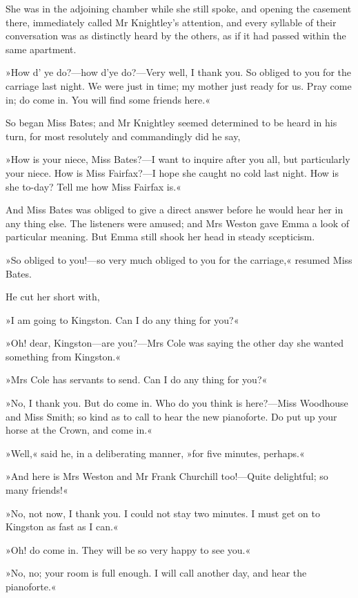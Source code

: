 She was in the adjoining chamber while she still spoke, and opening the casement there, immediately called Mr Knightley's attention, and every syllable of their conversation was as distinctly heard by the others, as if it had passed within the same apartment.

»How d' ye do?—how d'ye do?—Very well, I thank you. So obliged to you for the carriage last night. We were just in time; my mother just ready for us. Pray come in; do come in. You will find some friends here.«

So began Miss Bates; and Mr Knightley seemed determined to be heard in his turn, for most resolutely and commandingly did he say,

»How is your niece, Miss Bates?—I want to inquire after you all, but particularly your niece. How is Miss Fairfax?—I hope she caught no cold last night. How is she to-day? Tell me how Miss Fairfax is.«

And Miss Bates was obliged to give a direct answer before he would hear her in any thing else. The listeners were amused; and Mrs Weston gave Emma a look of particular meaning. But Emma still shook her head in steady scepticism.

»So obliged to you!—so very much obliged to you for the carriage,« resumed Miss Bates.

He cut her short with,

»I am going to Kingston. Can I do any thing for you?«

»Oh! dear, Kingston—are you?—Mrs Cole was saying the other day she wanted something from Kingston.«

»Mrs Cole has servants to send. Can I do any thing for you?«

»No, I thank you. But do come in. Who do you think is here?—Miss Woodhouse and Miss Smith; so kind as to call to hear the new pianoforte. Do put up your horse at the Crown, and come in.«

»Well,« said he, in a deliberating manner, »for five minutes, perhaps.«

»And here is Mrs Weston and Mr Frank Churchill too!—Quite delightful; so many friends!«

»No, not now, I thank you. I could not stay two minutes. I must get on to Kingston as fast as I can.«

»Oh! do come in. They will be so very happy to see you.«

»No, no; your room is full enough. I will call another day, and hear the pianoforte.«

